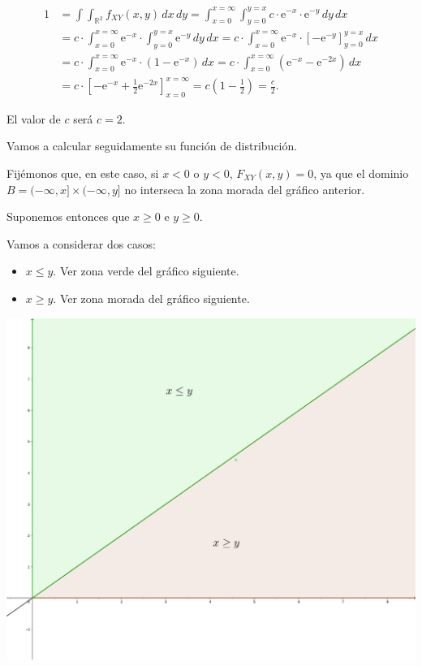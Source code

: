 \documentclass[]{book}
\begin{document}
\[
\begin{array}{rl}
1 &=  \int\int_{\mathbb{R}^2}f_{XY}(x,y)\, dx\, dy=\int_{x=0}^{x=\infty}\int_{y=0}^{y=x} c \cdot\mathrm{e}^{-x}\cdot\mathrm{e}^{-y} \, dy\, dx \\
  &=  c\cdot \int_{x=0}^{x=\infty}\mathrm{e}^{-x}\cdot\int_{y=0}^{y=x}\mathrm{e}^{-y}\, dy\, dx = c \cdot  \int_{x=0}^{x=\infty}\mathrm{e}^{-x}\cdot\left[-\mathrm{e}^{-y}\right]_{y=0}^{y=x}\, dx \\
  &=  c \cdot\int_{x=0}^{x=\infty}\mathrm{e}^{-x}\cdot\left(1-\mathrm{e}^{-x}\right)\, dx =c \cdot\int_{x=0}^{x=\infty}\left(\mathrm{e}^{-x}-\mathrm{e}^{-2x}\right)\, dx 
  \\ & =  c \cdot\left[-\mathrm{e}^{-x}+\frac{1}{2}\mathrm{e}^{-2x}\right]_{x=0}^{x=\infty} = c\left(1-\frac{1}{2}\right)=\frac{c}{2}.
\end{array}
\]

El valor de \(c\) será \(c=2\).

Vamos a calcular seguidamente su función de distribución.

Fijémonos que, en este caso, si \(x<0\) o \(y<0\), \(F_{XY}(x,y)=0\), ya que el dominio \(B=(-\infty,x]\times (-\infty,y]\) no interseca la zona morada del gráfico anterior.

Suponemos entonces que \(x\geq 0\) e \(y\geq 0\).

Vamos a considerar dos casos:

\begin{itemize}
\item
  \(x\leq y\). Ver zona verde del gráfico siguiente.
\item
  \(x\geq y\). Ver zona morada del gráfico siguiente.
\end{itemize}

\includegraphics{Images/Ejemplo2Bidi2.png}
\end{document}
